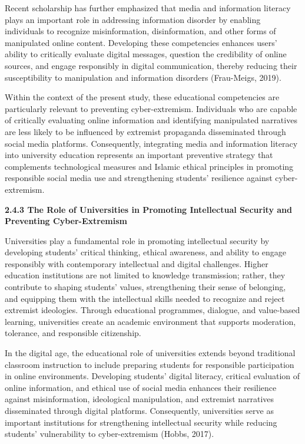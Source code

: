 \documentclass[11pt,a4paper]{article}
\begin{document}
	Recent scholarship has further emphasized that media and information literacy plays an important role in addressing information disorder by enabling individuals to recognize misinformation, disinformation, and other forms of manipulated online content. Developing these competencies enhances users' ability to critically evaluate digital messages, question the credibility of online sources, and engage responsibly in digital communication, thereby reducing their susceptibility to manipulation and information disorders (Frau-Meigs, 2019).
	
	Within the context of the present study, these educational competencies are particularly relevant to preventing cyber-extremism. Individuals who are capable of critically evaluating online information and identifying manipulated narratives are less likely to be influenced by extremist propaganda disseminated through social media platforms. Consequently, integrating media and information literacy into university education represents an important preventive strategy that complements technological measures and Islamic ethical principles in promoting responsible social media use and strengthening students' resilience against cyber-extremism.
	
	\textbf{2.4.3 The Role of Universities in Promoting Intellectual Security and Preventing Cyber-Extremism}
	
	Universities play a fundamental role in promoting intellectual security by developing students' critical thinking, ethical awareness, and ability to engage responsibly with contemporary intellectual and digital challenges. Higher education institutions are not limited to knowledge transmission; rather, they contribute to shaping students' values, strengthening their sense of belonging, and equipping them with the intellectual skills needed to recognize and reject extremist ideologies. Through educational programmes, dialogue, and value-based learning, universities create an academic environment that supports moderation, tolerance, and responsible citizenship.
	
	In the digital age, the educational role of universities extends beyond traditional classroom instruction to include preparing students for responsible participation in online environments. Developing students' digital literacy, critical evaluation of online information, and ethical use of social media enhances their resilience against misinformation, ideological manipulation, and extremist narratives disseminated through digital platforms. Consequently, universities serve as important institutions for strengthening intellectual security while reducing students' vulnerability to cyber-extremism (Hobbs, 2017).
	
\end{document}
